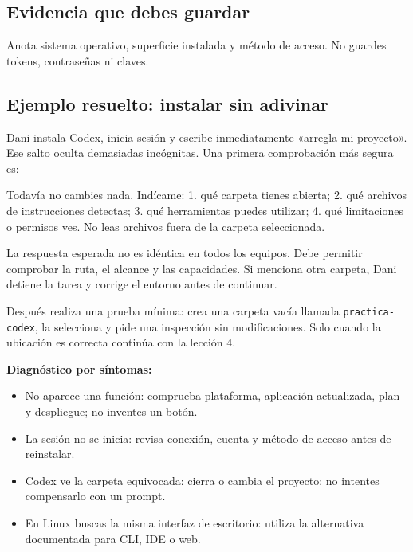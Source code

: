 \documentclass[10pt,a4paper,openany]{book}
\providecommand{\tightlist}{\setlength{\itemsep}{0.18em}\setlength{\parskip}{0pt}}
\newenvironment{Shaded}{}{}
\newcommand{\NormalTok}[1]{#1}
\renewenvironment{Shaded}
  {\begin{tcolorbox}[
    enhanced,
    breakable,
    colback=CodeBg,
    colframe=Border,
    boxrule=0.5pt,
    arc=2mm,
    left=3mm,
    right=3mm,
    top=2.2mm,
    bottom=2.2mm,
    before skip=0.8em,
    after skip=0.9em
  ]}
  {\end{tcolorbox}}
\begin{document}
\subsection{Evidencia que debes
guardar}\label{evidencia-que-debes-guardar-2}

Anota sistema operativo, superficie instalada y método de acceso. No
guardes tokens, contraseñas ni claves.

\subsection{Ejemplo resuelto: instalar sin
adivinar}\label{ejemplo-resuelto-instalar-sin-adivinar}

Dani instala Codex, inicia sesión y escribe inmediatamente «arregla mi
proyecto». Ese salto oculta demasiadas incógnitas. Una primera
comprobación más segura es:

\begin{Shaded}
\begin{Highlighting}[]
\NormalTok{Todavía no cambies nada. Indícame:}
\NormalTok{1. qué carpeta tienes abierta;}
\NormalTok{2. qué archivos de instrucciones detectas;}
\NormalTok{3. qué herramientas puedes utilizar;}
\NormalTok{4. qué limitaciones o permisos ves.}
\NormalTok{No leas archivos fuera de la carpeta seleccionada.}
\end{Highlighting}
\end{Shaded}

La respuesta esperada no es idéntica en todos los equipos. Debe permitir
comprobar la ruta, el alcance y las capacidades. Si menciona otra
carpeta, Dani detiene la tarea y corrige el entorno antes de continuar.

Después realiza una prueba mínima: crea una carpeta vacía llamada
\texttt{practica-codex}, la selecciona y pide una inspección sin
modificaciones. Solo cuando la ubicación es correcta continúa con la
lección 4.

\textbf{Diagnóstico por síntomas:}

\begin{itemize}
\tightlist
\item
  No aparece una función: comprueba plataforma, aplicación actualizada,
  plan y despliegue; no inventes un botón.
\item
  La sesión no se inicia: revisa conexión, cuenta y método de acceso
  antes de reinstalar.
\item
  Codex ve la carpeta equivocada: cierra o cambia el proyecto; no
  intentes compensarlo con un prompt.
\item
  En Linux buscas la misma interfaz de escritorio: utiliza la
  alternativa documentada para CLI, IDE o web.
\end{itemize}
\end{document}
